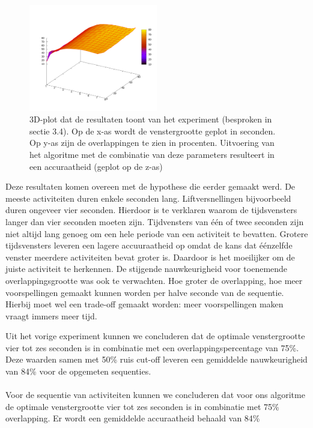 \documentclass{article}
\begin{document}
\begin{figure}[h]
\centering
\includegraphics[width=0.5\textwidth]{figures/3dplot}
\caption{3D-plot dat de resultaten toont van het experiment (besproken in sectie 3.4). Op de x-as wordt de venstergrootte geplot in seconden. Op y-as zijn de overlappingen te zien in procenten. Uitvoering van het algoritme met de combinatie van deze parameters resulteert in een accuraatheid (geplot op de z-as)}
\label{fig:3d}
\end{figure}

Deze resultaten komen overeen met de hypothese die eerder gemaakt werd. De meeste activiteiten duren enkele seconden lang. Liftversnellingen bijvoorbeeld duren ongeveer vier seconden. Hierdoor is te verklaren waarom de tijdsvensters langer dan vier seconden moeten zijn. Tijdvensters van \'e\'en of twee seconden zijn niet altijd lang genoeg om een hele periode van een activiteit te bevatten. Grotere tijdsvensters leveren een lagere accuuraatheid op omdat de kans dat \'e\'enzelfde venster meerdere activiteiten bevat groter is. Daardoor is het moeilijker om de juiste activiteit te herkennen. De stijgende nauwkeurigheid voor toenemende overlappingsgrootte was ook te verwachten. Hoe groter de overlapping, hoe meer voorspellingen gemaakt kunnen worden per halve seconde van de sequentie. Hierbij moet wel een trade-off gemaakt worden: meer voorspellingen maken vraagt immers meer tijd.

Uit het vorige experiment kunnen we concluderen dat de optimale venstergrootte vier tot zes seconden is in combinatie met een overlappingspercentage van 75\%. Deze waarden samen met 50\% ruis cut-off leveren een gemiddelde nauwkeurigheid van 84\% voor de opgemeten sequenties.
\\~\\

Voor de sequentie van activiteiten kunnen we concluderen dat voor ons algoritme de optimale venstergrootte vier tot zes seconden is in combinatie met 75\% overlapping. Er wordt een gemiddelde accuraatheid behaald van 84\%
\end{document}
